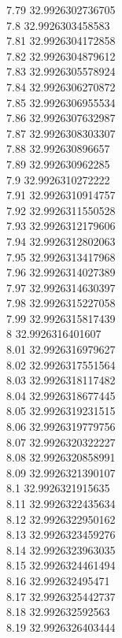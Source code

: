 {7.79	32.9926302736705\\
7.8	32.9926303458583\\
7.81	32.9926304172858\\
7.82	32.9926304879612\\
7.83	32.9926305578924\\
7.84	32.9926306270872\\
7.85	32.9926306955534\\
7.86	32.9926307632987\\
7.87	32.9926308303307\\
7.88	32.992630896657\\
7.89	32.992630962285\\
7.9	32.9926310272222\\
7.91	32.9926310914757\\
7.92	32.9926311550528\\
7.93	32.9926312179606\\
7.94	32.9926312802063\\
7.95	32.9926313417968\\
7.96	32.9926314027389\\
7.97	32.9926314630397\\
7.98	32.9926315227058\\
7.99	32.9926315817439\\
8	32.9926316401607\\
8.01	32.9926316979627\\
8.02	32.9926317551564\\
8.03	32.9926318117482\\
8.04	32.9926318677445\\
8.05	32.9926319231515\\
8.06	32.9926319779756\\
8.07	32.9926320322227\\
8.08	32.9926320858991\\
8.09	32.9926321390107\\
8.1	32.9926321915635\\
8.11	32.9926322435634\\
8.12	32.9926322950162\\
8.13	32.9926323459276\\
8.14	32.9926323963035\\
8.15	32.9926324461494\\
8.16	32.992632495471\\
8.17	32.9926325442737\\
8.18	32.992632592563\\
8.19	32.9926326403444\\
}
